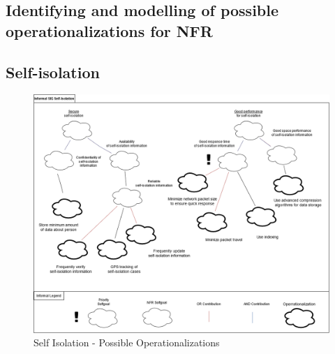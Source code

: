 \documentclass{VUMIFPSkursinis}
\begin{document}
\begin{landscape}
\section{Identifying and modelling of possible operationalizations for NFR}
	\subsection{Self-isolation}
			\begin{figure}[H]
				\center
				\includegraphics[scale=0.4]{img/Self-Isolation-3}
				\caption{Self Isolation - Possible Operationalizations} %
				\label{img:kurimoProcesas}
			\end{figure}
		

\end{landscape}
\end{document}
